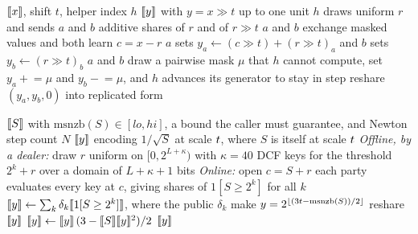 \begin{algorithm}[h]
\caption{$\mathsf{TruncatePair}$, truncation by $t$ bits with helper $h$
(\texttt{src/mpc/nonlinear/trunc.cpp}). Parties $a$ and $b$ are the other two.}
\label{alg:trunc}
\begin{algorithmic}[1]
\Require $\llbracket x \rrbracket$, shift $t$, helper index $h$
\Ensure $\llbracket y \rrbracket$ with $y = x \gg t$ up to one unit
\State $h$ draws uniform $r$ and sends $a$ and $b$ additive shares of $r$ and of
  $r \gg t$ 
\State $a$ and $b$ exchange masked values and both learn $c = x - r$
\State $a$ sets $y_a \gets (c \gg t) + (r \gg t)_a$ and $b$ sets $y_b \gets
  (r \gg t)_b$
\State $a$ and $b$ draw a pairwise mask $\mu$ that $h$ cannot compute, set
  $y_a \mathrel{+}= \mu$ and $y_b \mathrel{-}= \mu$, and $h$ advances its generator
  to stay in step
\State reshare $(y_a, y_b, 0)$ into replicated form 
\end{algorithmic}
\end{algorithm}

\begin{algorithm}[h]
\caption{The MSNZB gate and the shared inverse square root
(\texttt{src/mpc/nonlinear/msnzb.cpp}).}
\label{alg:msnzb}
\begin{algorithmic}[1]
\Require $\llbracket S \rrbracket$ with $\mathrm{msnzb}(S) \in [\mathit{lo}, \mathit{hi}]$, a
  bound the caller must guarantee, and Newton step count $N$
\Ensure $\llbracket y \rrbracket$ encoding $1/\sqrt{S}$ at scale $t$, where $S$ is itself
  at scale $t$
\Statex \textit{Offline, by a dealer:}
\State draw $r$ uniform on $[0, 2^{L + \kappa})$ with $\kappa = 40$
  \State DCF keys for the threshold $2^k + r$ over a domain of $L + \kappa + 1$
    bits
\EndFor
\Statex \textit{Online:}
\State open $c = S + r$ 
\State each party evaluates every key at $c$, giving shares of $1[S \ge 2^k]$ for
  all $k$
\State $\llbracket y \rrbracket \gets \sum_k \delta_k \llbracket 1[S \ge 2^k] \rrbracket$, where the public
  $\delta_k$ make $y = 2^{\lfloor(3t - \mathrm{msnzb}(S))/2\rfloor}$
\State reshare $\llbracket y \rrbracket$ 
  \State $\llbracket y \rrbracket \gets \llbracket y \rrbracket\,(3 - \llbracket S \rrbracket\llbracket y \rrbracket^2) / 2$
\EndFor
\State \Return $\llbracket y \rrbracket$ 
\end{algorithmic}
\end{algorithm}

